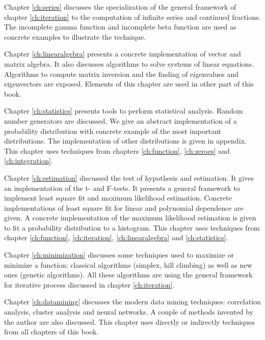 Chapter \ref{ch:series} discusses the specialization of the
general framework of chapter \ref{ch:iteration} to the computation
of infinite series and continued fractions. The incomplete gamma
function and incomplete beta function are used as concrete
examples to illustrate the technique.

Chapter \ref{ch:linearalgebra} presents a concrete implementation
of vector and matrix algebra. It also discusses algorithms to
solve systems of linear equations. Algorithms to compute matrix
inversion and the finding of eigenvalues and eigenvectors are
exposed. Elements of this chapter are used in other part of this
book.

Chapter \ref{ch:statistics} presents tools to perform statistical
analysis. Random number generators are discussed. We give an
abstract implementation of a probability distribution with
concrete example of the most important distributions. The
implementation of other distributions is given in appendix. This
chapter uses techniques from chapters \ref{ch:function},
\ref{ch:zeroes} and \ref{ch:integration}.

Chapter \ref{ch:estimation} discussed the test of hypothesis and
estimation. It gives an implementation of the t- and F-tests. It
presents a general framework to implement least square fit and
maximum likelihood estimation. Concrete implementations of least
square fit for linear and polynomial dependence are given. A
concrete implementation of the maximum likelihood estimation is
given to fit a probability distribution to a histogram. This
chapter uses techniques from chapter \ref{ch:function},
\ref{ch:iteration}, \ref{ch:linearalgebra} and
\ref{ch:statistics}.

Chapter \ref{ch:minimization} discusses some techniques used to
maximize or minimize a function: classical algorithms (simplex,
hill climbing) as well as new ones (genetic algorithms). All these
algorithms are using the general framework for iterative process
discussed in chapter \ref{ch:iteration}.

Chapter \ref{ch:datamining} discusses the modern data mining
techniques: correlation analysis, cluster analysis and neural
networks. A couple of methods invented by the author are also
discussed. This chapter uses directly or indirectly techniques
from all chapters of this book.

